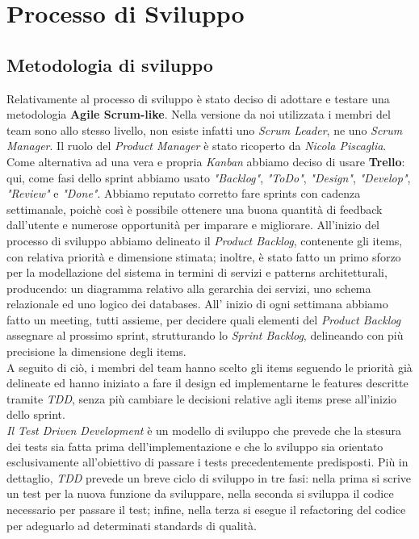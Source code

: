 \chapter{Processo di Sviluppo}
\section{Metodologia di sviluppo}
Relativamente al processo di sviluppo è stato deciso di adottare e testare una
metodologia \textbf{Agile Scrum-like}. \newline
Nella versione da noi utilizzata
i membri del team sono allo stesso livello, non esiste infatti
uno \textit{Scrum Leader}, ne uno \textit{Scrum Manager}. Il ruolo del \textit{Product Manager} è
stato ricoperto da \textit{Nicola Piscaglia}. 
Come alternativa ad una vera e propria \textit{Kanban} abbiamo
deciso di usare \textbf{Trello}: qui, come fasi dello sprint abbiamo usato \textit{"Backlog"}, \textit{"ToDo"}, \textit{"Design"}, 
\textit{"Develop"}, \textit{"Review"} e \textit{"Done"}. Abbiamo reputato corretto fare
sprints con cadenza settimanale, poichè così è possibile ottenere una buona quantità di feedback
dall'utente e numerose opportunità per imparare e migliorare. \newline
All'inizio del processo di sviluppo abbiamo delineato il \textit{Product Backlog}, contenente gli items, 
con relativa priorità e dimensione stimata; inoltre, è stato fatto un primo sforzo per la modellazione del sistema
in termini di servizi e patterns architetturali, producendo: un diagramma relativo alla gerarchia dei servizi,
uno schema relazionale ed uno logico dei databases.
\newline
All' inizio di ogni settimana abbiamo fatto un meeting, tutti assieme,
per decidere quali elementi del \textit{Product Backlog} assegnare al
prossimo sprint, strutturando lo
\textit{Sprint Backlog}, delineando con più precisione la dimensione degli items. 
\\A seguito di ciò,
i membri del team hanno scelto gli items seguendo le priorità già delineate 
ed hanno iniziato a fare il design ed implementarne le features descritte tramite \textit{TDD}, senza più cambiare le decisioni
 relative agli items prese all'inizio dello sprint. 
 \\\textit{Il Test Driven Development} è un modello di sviluppo che prevede che la stesura dei tests sia fatta prima dell'implementazione e che lo sviluppo sia orientato esclusivamente all'obiettivo di passare i tests precedentemente predisposti. Più in dettaglio, \textit{TDD} prevede un breve ciclo di sviluppo in tre fasi: nella prima si scrive un test per la nuova funzione da sviluppare, nella seconda si sviluppa il codice necessario per passare il test; infine, nella terza si esegue il refactoring del codice per adeguarlo ad determinati standards di qualità.

